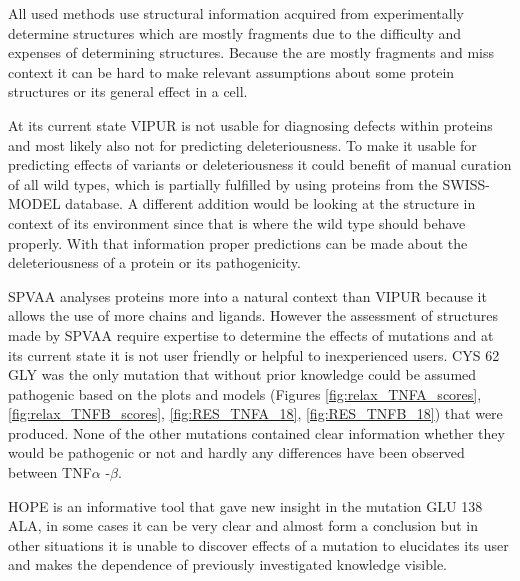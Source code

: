 All used methods use structural information acquired from experimentally determine structures which are mostly fragments due to the difficulty and expenses of determining structures. Because the are mostly fragments and miss context it can be hard to make relevant assumptions about some protein structures or its general effect in a cell.

At its current state VIPUR is not usable for diagnosing defects within proteins and most likely also not for predicting deleteriousness. To make it usable for predicting effects of variants or deleteriousness it could benefit of manual curation of all wild types, which is partially fulfilled by using proteins from the SWISS-MODEL database. A different addition would be looking at the structure in context of its environment since that is where the wild type should behave properly. With that information proper predictions can be made about the deleteriousness of a protein or its pathogenicity.  

SPVAA analyses proteins more into a natural context than VIPUR because it allows the use of more chains and ligands. However the assessment of structures made by SPVAA require expertise to determine the effects of mutations and at its current state it is not user friendly or helpful to inexperienced users. CYS 62 GLY was the only mutation that without prior knowledge could be assumed pathogenic based on the plots and models (Figures \ref{fig:relax_TNFA_scores}, \ref{fig:relax_TNFB_scores}, \ref{fig:RES_TNFA_18}, \ref{fig:RES_TNFB_18}) that were produced. None of the other mutations contained clear information whether they would be pathogenic or not and hardly any differences have been observed between TNF$\alpha$ -$\beta$. 

HOPE is an informative tool that gave new insight in the mutation GLU 138 ALA, in some cases it can be very clear and almost form a conclusion but in other situations it is unable to discover effects of a mutation to elucidates its user and makes the dependence of previously investigated knowledge visible.
